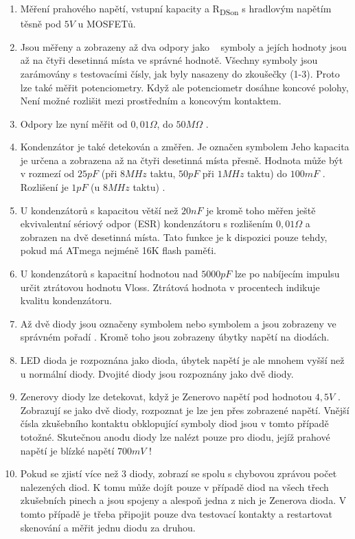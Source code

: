 \begin{enumerate}
\item Měření prahového napětí, vstupní kapacity a R\textsubscript{DSon} s hradlovým napětím těsně pod \(5V\) u MOSFETů.
\item Jsou měřeny a zobrazeny až dva odpory jako \mbox{~\electricR} symboly a jejích hodnoty jsou až na čtyři desetinná místa ve správné hodnotě.
Všechny symboly jsou zarámovány s testovacími čísly, jak byly nasazeny do zkoušečky (1-3).
Proto lze také měřit potenciometry. Když ale potenciometr dosáhne koncové polohy,
Není možné rozlišit mezi prostředním a koncovým kontaktem.
\item Odpory lze nyní měřit od \(0,01\Omega\), do \(50M\Omega\) .
\item Kondenzátor je také detekován a změřen. Je označen symbolem \mbox{\electricC}
Jeho kapacita je určena a zobrazena až na čtyři desetinná místa přesně.
Hodnota může být v rozmezí od \(25pF\) (při \(8MHz\) taktu, \(50pF\) při \(1MHz\) taktu) do \(100mF\) . Rozlišení je \(1pF\) (u \(8MHz\) taktu) .
\item U kondenzátorů s kapacitou větší než \(20nF\) je kromě toho měřen ještě ekvivalentní sériový odpor (ESR) kondenzátoru
s rozlišením \(0,01\Omega\) a zobrazen na dvě desetinná místa.
Tato funkce je k dispozici pouze tehdy, pokud má ATmega nejméně 16K flash paměťi.
\item U kondenzátorů s kapacitní hodnotou nad \(5000pF\) lze po nabíjecím impulsu určit ztrátovou hodnotu Vloss.
Ztrátová hodnota v procentech indikuje kvalitu kondenzátoru.
\item Až dvě diody jsou označeny symbolem \mbox{\electricDAK} nebo symbolem \mbox{\electricDKA}
a jsou zobrazeny ve správném pořadí .
Kromě toho jsou zobrazeny úbytky napětí na diodách.
\item LED dioda je rozpoznána jako dioda, úbytek napětí je ale mnohem vyšší než u normální diody.
Dvojité diody jsou rozpoznány jako dvě diody.
\item Zenerovy diody lze detekovat, když je Zenerovo napětí pod hodnotou \(4,5V\) .
Zobrazují se jako dvě diody, rozpoznat je lze jen přes zobrazené napětí.
Vnější čísla zkušebního kontaktu obklopující symboly diod jsou v tomto případě totožné.
Skutečnou anodu diody lze nalézt pouze pro diodu, jejíž prahové napětí je blízké napětí \(700mV\) !
\item Pokud se zjistí více než 3 diody, zobrazí se spolu s chybovou zprávou počet nalezených diod.
K tomu může dojít pouze v případě diod na všech třech zkušebních pinech a jsou spojeny a alespoň jedna z nich je Zenerova dioda. V tomto případě je třeba připojit pouze dva testovací kontakty a restartovat skenování a měřit jednu diodu za druhou.

\end{enumerate}
